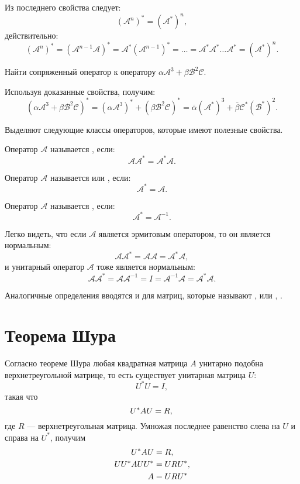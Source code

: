 Из последнего свойства следует:
\[
    \left ( \mathcal{A}^n \right )^* = \left ( \mathcal{A}^* \right )^n ,
\]
действительно:
\[
    \left ( \mathcal{A}^n \right )^*
    = \left ( \mathcal{A}^{n-1} \mathcal{A} \right )^*
    = \mathcal{A}^* \left ( \mathcal{A}^{n-1} \right )^*
    = \dots
    = \mathcal{A}^* \mathcal{A}^* \dots \mathcal{A}^*
    = \left ( \mathcal{A}^* \right )^n .
\]

\begin{example}
    Найти сопряженный оператор к оператору $\alpha \mathcal{A}^3 + \beta \mathcal{B}^2 \mathcal{C}$.

    Используя доказанные свойства, получим:
    \[
        \left ( \alpha \mathcal{A}^3 + \beta \mathcal{B}^2 \mathcal{C} \right )^*
        = \left ( \alpha \mathcal{A}^3 \right )^* + \left ( \beta \mathcal{B}^2 \mathcal{C} \right )^*
        = \overline{\alpha} \left ( \mathcal{A}^* \right )^3 + \overline{\beta} \mathcal{C}^* \left ( \mathcal{B}^* \right )^2 .
    \]
\end{example}

Выделяют следующие классы операторов, которые имеют полезные свойства.

Оператор $\mathcal{A}$ называется , если:
\[
    \mathcal{A} \mathcal{A}^* = \mathcal{A}^* \mathcal{A}.
\]

Оператор $\mathcal{A}$ называется  или , если:
\[
    \mathcal{A}^* = \mathcal{A}.
\]

Оператор $\mathcal{A}$ называется , если:
\[
    \mathcal{A}^* = \mathcal{A}^{-1}.
\]

Легко видеть, что если $\mathcal{A}$ является эрмитовым оператором, то он является нормальным:
\[
    \mathcal{A} \mathcal{A}^*
    = \mathcal{A} \mathcal{A}
    = \mathcal{A}^* \mathcal{A},
\]
и унитарный оператор $\mathcal{A}$ тоже является нормальным:
\[
    \mathcal{A} \mathcal{A}^*
    = \mathcal{A} \mathcal{A}^{-1}
    = I
    = \mathcal{A}^{-1} \mathcal{A}
    = \mathcal{A}^* \mathcal{A}.
\]

Аналогичные определения вводятся и для матриц, которые называют ,  или , .


\section{Теорема Шура}

Согласно теореме Шура любая квадратная матрица $A$ унитарно подобна верхнетреугольной матрице, то есть существует унитарная матрица $U$:
\[
    U^* U = I,
\]
такая что
\[
    U^* A U = R, \\
\]
где $R$ --- верхнетреугольная матрица. Умножая последнее равенство слева на $U$ и справа на $U^*$, получим
\begin{align}
    U^* A U & = R,
    \notag \\
    U U^* A U U^* & = U R U^*,
    \notag \\
    A & = U R U^*
    \label{rayleigh:schur:decomposition}
\end{align}

